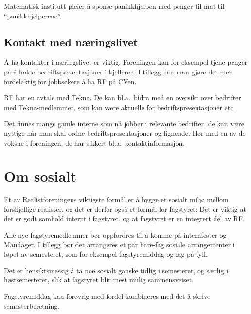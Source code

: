 Matematisk institutt pleier å sponse panikkhjelpen med penger til mat til
``panikkhjelperene''.

\subsection{Kontakt med næringslivet}
Å ha kontakter i næringslivet er viktig. Foreningen kan for eksempel tjene
penger på å holde bedriftspresentasjoner i kjelleren. I tillegg kan man gjøre
det mer fordelaktig for jobbsøkere å ha RF på CVen.

RF har en avtale med Tekna. De kan bl.a.~bidra med en oversikt over bedrifter
med Tekna-medlemmer, som kan være aktuelle for bedriftspresentasjoner etc.

Det finnes mange gamle interne som nå jobber i relevante bedrifter, de kan være
nyttige når man skal ordne bedriftspresentasjoner og lignende. Hør med en av de
voksne i foreningen, de har sikkert bl.a.~kontaktinformasjon.


\section{Om sosialt}
Et av Realistforeningens viktigste formål er å bygge et sosialt miljø
mellom forskjellige realister, og det er derfor også et formål for
fagstyret; Det er viktig at det er godt samhold internt i fagstyret, og
at fagstyret er en integrert del av RF.

Alle nye fagstyremedlemmer bør oppfordres til å komme på internfester og Mandager.
I tillegg bør det arrangeres et par bare-fag sosiale arrangementer i løpet av
semesteret, som for eksempel fagstyremiddag og fag-på-fyll.

Det er hensiktsmessig å ta noe sosialt ganske tidlig i semesteret, og særlig i
høstsemesteret, slik at fagstyret blir mest mulig sammensveiset.

Fagstyremiddag kan forøvrig med fordel kombineres med det å skrive semesterberetning.

